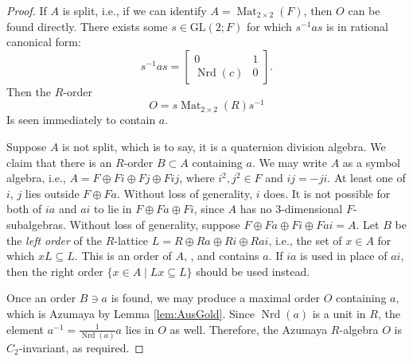 \documentclass[reqno,oneside,dvipsnames,pdfnames,final]{amsart}
\theoremstyle{definition}
\newcommand{\GL}{\mathrm{GL}}
\newcommand{\Mat}{\operatorname{Mat}}
\newcommand{\Nrd}{\operatorname{Nrd}}
\begin{document}
\begin{proof}
  If $A$ is split, i.e., if we can identify $A = \Mat_{2\times 2}(F)$, then $O$ can be found directly. There exists some $s \in \GL(2;F)$ for which $s^{-1}as$ is in rational canonical form:
  \[ s^{-1}as =
    \begin{bmatrix}
      0 & 1 \\ \Nrd(c) & 0
    \end{bmatrix}. \]
  Then the $R$-order
  \[ O =  s \Mat_{2 \times 2}(R) s^{-1} \]
  Is seen immediately to contain $a$.

  Suppose $A$ is not split, which is to say, it is a quaternion division algebra. We claim that there is an $R$-order $B \subset A$ containing $a$. We may write $A$ as a symbol algebra, i.e., $A=F \oplus Fi \oplus Fj \oplus Fij$, where $i^2, j^2 \in F$ and $ij=-ji$. At least one of $i$, $j$ lies outside $F \oplus Fa$. Without loss of generality, $i$ does. It is not possible for both of $ia$ and $ai$ to lie in $F \oplus Fa \oplus Fi$, since $A$ has no $3$-dimensional $F$-subalgebras. Without loss of generality, suppose $F \oplus Fa \oplus Fi \oplus Fai = A$. Let $B$ be the \emph{left order} of the $R$-lattice $L =R \oplus Ra \oplus Ri \oplus Rai$, i.e., the set of $x \in A$ for which $x L \subseteq L$. This is an order of $A$, \cite[p.~109]{Reiner1975}, and contains $a$. If $ia$ is used in place of $ai$, then the right order $\{ x \in A \mid Lx \subseteq L \}$ should be used instead.
  
  Once an order $B \ni a$ is found, we may produce a maximal order $O$ containing $a$, which is Azumaya by Lemma \ref{lem:AusGold}. Since $\Nrd(a)$ is a unit in $R$, the element $a^{-1} = \frac{1}{\Nrd(a)} a$ lies in $O$ as well. Therefore, the Azumaya $R$-algebra $O$ is $C_2$-invariant, as required.
\end{proof}
\end{document}
